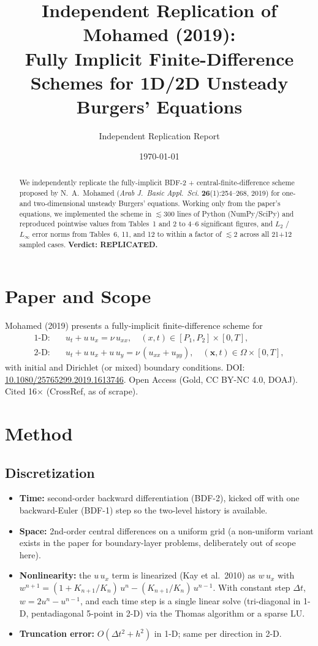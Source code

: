 \documentclass[11pt]{article}
\title{Independent Replication of Mohamed (2019):\\
Fully Implicit Finite-Difference Schemes for 1D/2D Unsteady Burgers' Equations}
\author{Independent Replication Report}
\date{\today}
\begin{document}
\maketitle

\begin{abstract}
We independently replicate the fully-implicit BDF-2 + central-finite-difference
scheme proposed by N.~A.~Mohamed (\emph{Arab J.\ Basic Appl.\ Sci.} \textbf{26}(1):254--268, 2019)
for one- and two-dimensional unsteady Burgers' equations. Working only from the
paper's equations, we implemented the scheme in \(\lesssim 300\) lines of Python
(NumPy/SciPy) and reproduced pointwise values from Tables~1 and 2 to 4--6
significant figures, and \(L_2\) / \(L_\infty\) error norms from Tables~6, 11,
and 12 to within a factor of \(\lesssim 2\) across all 21+12 sampled cases.
\textbf{Verdict: REPLICATED.}
\end{abstract}

\section{Paper and Scope}
Mohamed (2019) presents a fully-implicit finite-difference scheme for
\begin{align}
\text{1-D:} \quad & u_t + u\,u_x = \nu\,u_{xx}, \quad (x,t)\in[P_1,P_2]\times[0,T], \\
\text{2-D:} \quad & u_t + u\,u_x + u\,u_y = \nu\,(u_{xx}+u_{yy}), \quad (\mathbf{x},t)\in\Omega\times[0,T],
\end{align}
with initial and Dirichlet (or mixed) boundary conditions. DOI:
\href{https://doi.org/10.1080/25765299.2019.1613746}{10.1080/25765299.2019.1613746}.
Open Access (Gold, CC BY-NC 4.0, DOAJ). Cited 16\(\times\) (CrossRef, as of scrape).

\section{Method}
\subsection{Discretization}
\begin{itemize}
  \item \textbf{Time:} second-order backward differentiation (BDF-2), kicked off with one
        backward-Euler (BDF-1) step so the two-level history is available.
  \item \textbf{Space:} 2nd-order central differences on a uniform grid (a
        non-uniform variant exists in the paper for boundary-layer problems,
        deliberately out of scope here).
  \item \textbf{Nonlinearity:} the \(u\,u_x\) term is linearized (Kay et al.\ 2010)
        as \(w\,u_x\) with
        \(w^{n+1} = (1 + K_{n+1}/K_n)\,u^n - (K_{n+1}/K_n)\,u^{n-1}\).
        With constant step \(\Delta t\), \(w = 2u^n - u^{n-1}\), and each time
        step is a single linear solve (tri-diagonal in 1-D, pentadiagonal
        5-point in 2-D) via the Thomas algorithm or a sparse LU.
  \item \textbf{Truncation error:} \(O(\Delta t^2 + h^2)\) in 1-D; same per
        direction in 2-D.
\end{itemize}
\end{document}
